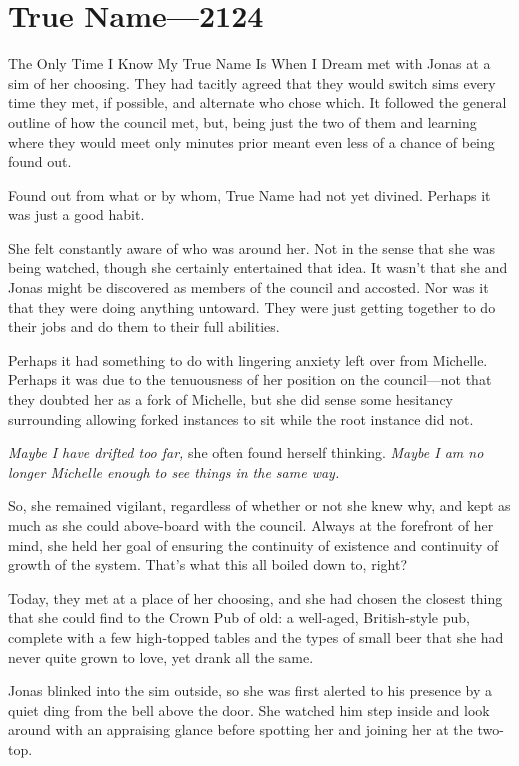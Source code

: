 \hypertarget{true-name-2124}{%
\chapter{True Name—2124}\label{true-name-2124}}

The Only Time I Know My True Name Is When I Dream met with Jonas at a sim of her choosing. They had tacitly agreed that they would switch sims every time they met, if possible, and alternate who chose which. It followed the general outline of how the council met, but, being just the two of them and learning where they would meet only minutes prior meant even less of a chance of being found out.

Found out from what or by whom, True Name had not yet divined. Perhaps it was just a good habit.

She felt constantly aware of who was around her. Not in the sense that she was being watched, though she certainly entertained that idea. It wasn't that she and Jonas might be discovered as members of the council and accosted. Nor was it that they were doing anything untoward. They were just getting together to do their jobs and do them to their full abilities.

Perhaps it had something to do with lingering anxiety left over from Michelle. Perhaps it was due to the tenuousness of her position on the council---not that they doubted her as a fork of Michelle, but she did sense some hesitancy surrounding allowing forked instances to sit while the root instance did not.

\emph{Maybe I have drifted too far,} she often found herself thinking. \emph{Maybe I am no longer Michelle enough to see things in the same way.}

So, she remained vigilant, regardless of whether or not she knew why, and kept as much as she could above-board with the council. Always at the forefront of her mind, she held her goal of ensuring the continuity of existence and continuity of growth of the system. That's what this all boiled down to, right?

Today, they met at a place of her choosing, and she had chosen the closest thing that she could find to the Crown Pub of old: a well-aged, British-style pub, complete with a few high-topped tables and the types of small beer that she had never quite grown to love, yet drank all the same.

Jonas blinked into the sim outside, so she was first alerted to his presence by a quiet ding from the bell above the door. She watched him step inside and look around with an appraising glance before spotting her and joining her at the two-top.

